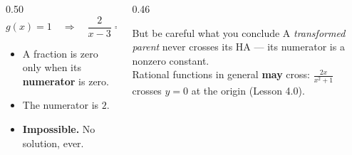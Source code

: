 \documentclass[aspectratio=169, 11pt]{beamer}
\begin{document}
\begin{frame}[t, plain]
  \begin{columns}[T]
    \begin{column}{0.50\textwidth}
      \[ g(x)=1 \quad\Longrightarrow\quad \frac{2}{x-3}=0 \]
      \vspace{-6pt}
      \begin{itemize}\setlength{\itemsep}{3pt}
        \item A fraction is zero only when its \textbf{numerator} is zero.
        \item The numerator is $2$.
        \item \textbf{Impossible.} No solution, ever.
      \end{itemize}
    \end{column}
    \begin{column}{0.46\textwidth}
      \begin{block}{But be careful what you conclude}
        A \emph{transformed parent} never crosses its HA --- its numerator is a nonzero constant.
        \\[3pt]
        Rational functions in general \textbf{may} cross: $\frac{2x}{x^2+1}$ crosses $y=0$ at the
        origin (Lesson 4.0).
      \end{block}
    \end{column}
  \end{columns}
\end{frame}
\end{document}
